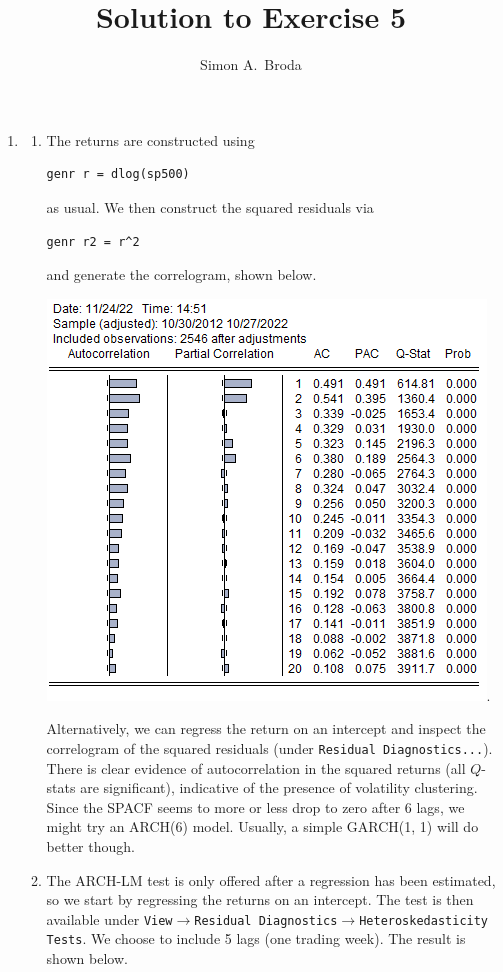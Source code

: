 \documentclass[11pt, a4paper]{article}
\begin{document}
\title{Solution to Exercise 5}
\author{Simon A.\ Broda}
\date{}
\maketitle

\begin{enumerate}


\item
\begin{enumerate}
\item The returns are constructed using
\begin{verbatim}
genr r = dlog(sp500)
\end{verbatim}
as usual.
We then construct the squared residuals via
\begin{verbatim}
genr r2 = r^2
\end{verbatim}
and generate the correlogram, shown below.
\begin{center}
\includegraphics[width=.6\textwidth]{sp500corr_sq}.
\end{center}
Alternatively, we can regress the return on an intercept and inspect the correlogram of the squared residuals (under \texttt{Residual Diagnostics...}).
There is clear evidence of autocorrelation in the squared returns (all $Q$-stats are significant), indicative of the presence of volatility clustering. Since the SPACF seems to more or less drop to zero after 6 lags, we might try an ARCH(6) model. Usually, a simple GARCH(1, 1) will do better though.
\item The ARCH-LM test is only offered after a regression has been estimated, so we start by regressing the returns on an intercept. The test is then available under \texttt{View$\rightarrow$Residual Diagnostics$\rightarrow$Heteroskedasticity Tests}. We choose to include 5 lags (one trading week). The result is shown below.
\begin{center}

\end{center}
\end{enumerate}
\end{enumerate}
\end{document}
